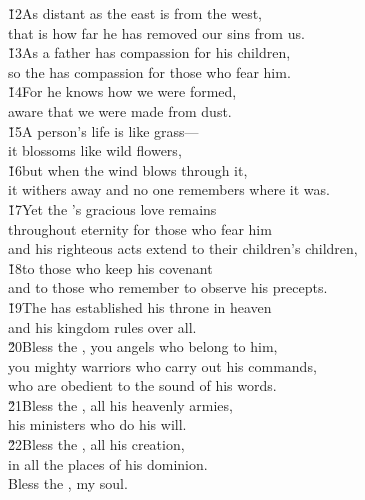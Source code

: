 \begin{poetry}
\poeml \v{12}As distant as the east is from the west, \\
\poemll    that is how far he has removed our sins from us. \\
\poeml \v{13}As a father has compassion for his children, \\
\poemll    so the  has compassion for those who fear him. \\
\poeml \v{14}For he knows how we were formed, \\
\poemll    aware that we were made from dust. \\
\poeml \v{15}A person's life is like grass--- \\
\poemll    it blossoms like wild flowers, \\
\poeml \v{16}but when the wind blows through it, \\
\poemll    it withers away and no one remembers where it was. \\
\poeml \v{17}Yet the 's gracious love remains \\
\poemll    throughout eternity for those who fear him \\
\poemlll       and his righteous acts extend to their children's children, \\
\poeml \v{18}to those who keep his covenant \\
\poemll    and to those who remember to observe his precepts. \\
\poeml \v{19}The  has established his throne in heaven \\
\poemll    and his kingdom rules over all. \\
\poeml \v{20}Bless the , you angels who belong to him, \\
\poemll    you mighty warriors who carry out his commands, \\
\poemlll       who are obedient to the sound of his words. \\
\poeml \v{21}Bless the , all his heavenly armies, \\
\poemll    his ministers who do his will. \\
\poeml \v{22}Bless the , all his creation, \\
\poemll    in all the places of his dominion. \\
\poeml Bless the , my soul.
\end{poetry}

